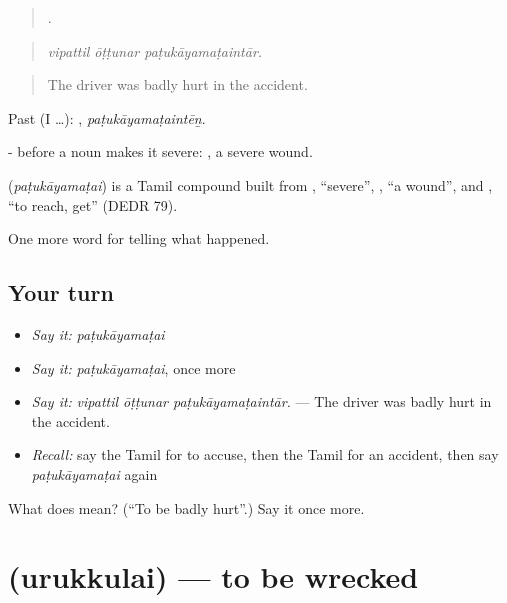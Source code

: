 \begin{quote}
  .
\end{quote}

\begin{quote}
\emph{vipattil ōṭṭunar paṭukāyamaṭaintār.}
\end{quote}

\begin{quote}
The driver was badly hurt in the accident.
\end{quote}

Past (I …): , \emph{paṭukāyamaṭaintēṉ}.

- before a noun makes it severe: , a severe wound.

\begin{cousinweb}
\textbf{} (\emph{paṭukāyamaṭai}) is a Tamil compound built from , \textquotedblleft{}severe\textquotedblright{}, , \textquotedblleft{}a wound\textquotedblright{}, and , \textquotedblleft{}to reach, get\textquotedblright{} (DEDR 79).
\end{cousinweb}

\begin{grammarlens}[title={What you've built}]
One more word for telling what happened.
\end{grammarlens}

\subsection*{Your turn}
\begin{itemize}
\raggedright
  \item \emph{Say it:} \emph{paṭukāyamaṭai}
  \item \emph{Say it:} \emph{paṭukāyamaṭai}, once more
  \item \emph{Say it:} \emph{vipattil ōṭṭunar paṭukāyamaṭaintār.} — The driver was badly hurt in the accident.
  \item \emph{Recall:} say the Tamil for to accuse, then the Tamil for an accident, then say \emph{paṭukāyamaṭai} again
\end{itemize}

\begin{tcolorbox}[breakable,colback=teal!4,colframe=teal!35!black,title={Before you move on}]
What does  mean? (\textquotedblleft{}To be badly hurt\textquotedblright{}.) Say it once more.
\end{tcolorbox}
\section[\texorpdfstring{\ta{உருக்குலை} (urukkulai)}{உருக்குலை (urukkulai)}]{ (urukkulai) — to be wrecked}

